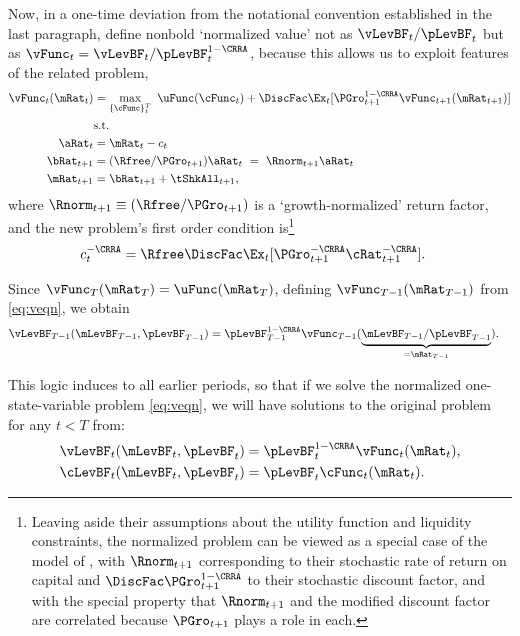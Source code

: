 \documentclass[BufferStockTheory]{subfiles}
\begin{document}
\hypertarget{The-Related-Problem}{}
Now, in a one-time deviation from the notational convention established in the last paragraph, define nonbold `normalized value' not as $\vLevBF_{t}/\pLevBF_{t}$ but as $\vFunc_{t} = \vLevBF_{t}/\pLevBF_{t}^{1-\CRRA}$, because this allows us to exploit features of the related problem,
\begin{align}
  \vFunc_{t}(\mRat_{t})  & = \max_{\{\cFunc\}_{t}^{T}}~  \uFunc(\cFunc_{t}) +\DiscFac \Ex_{t}[\PGro_{t+1}^{1-\CRRA}\vFunc_{t+1}({\mRat}_{t+1})] \notag \\
                         & \mbox{s.t.}  \label{eq:veqn} 
  \\ {\aRat}_{t}  & = \mRat_{t}-c_{t}  \notag
  \\ {\bRat}_{t+1}  & = (\Rfree/\PGro_{t+1})\aRat_{t}  ~ = ~ \Rnorm_{t+1}\aRat_{t}  \notag
  \\ \mRat_{t+1}  & = \bRat_{t+1}+\tShkAll_{t+1}  \notag, %
\end{align}
where $\Rnorm_{t+1}\equiv (\Rfree/\PGro_{t+1})$ is a `growth-normalized' return factor, and the new problem's first order condition is\footnote{Leaving aside their assumptions about the utility function and liquidity constraints, the normalized problem can be viewed as a special case of the model of \cite{mstIncFluct}, with $\Rnorm_{t+1}$ corresponding to their stochastic rate of return on capital and $\DiscFac \PGro_{t+1}^{1-\CRRA}$ to their stochastic discount factor, and with the special property that $\Rnorm_{t+1}$ and the modified discount factor are correlated because $\PGro_{t+1}$ plays a role in each.}
\begin{align}
  c_{t}^{-\CRRA}  & = \Rfree \DiscFac \Ex_{t}[ {\PGro}_{t+1}^{-\CRRA} {\cRat}
                    _{t+1}^{-\CRRA}].  \label{eq:scaledeuler}
\end{align}

Since $\vFunc_{T}(\mRat_{T}) = \uFunc(\mRat_{T})$, defining $\vFunc_{T-1}(\mRat_{T-1})$ from \eqref{eq:veqn}, we obtain
\begin{align*}
  \vLevBF_{T-1}(\mLevBF_{T-1},\pLevBF_{T-1})  & = \pLevBF_{T-1}^{1-\CRRA} \vFunc_{T-1}(\underbrace{\mLevBF_{T-1}/\pLevBF_{T-1}}_{=\mRat_{T-1}}).
\end{align*}

This logic induces to all earlier periods, so that if we solve the
normalized one-state-variable problem \eqref{eq:veqn}, we
will have solutions to the original problem for any $t<T$
from:
\begin{align*}
  \vLevBF_{t}(\mLevBF_{t},\pLevBF_{t})  & = \pLevBF_{t}^{1-\CRRA}\vFunc_{t}(\mRat_{t}),
  \\ \cLevBF_{t}(\mLevBF_{t},\pLevBF_{t})  & = \pLevBF_{t}\cFunc_{t}(\mRat_{t}).
\end{align*}
\end{document}
